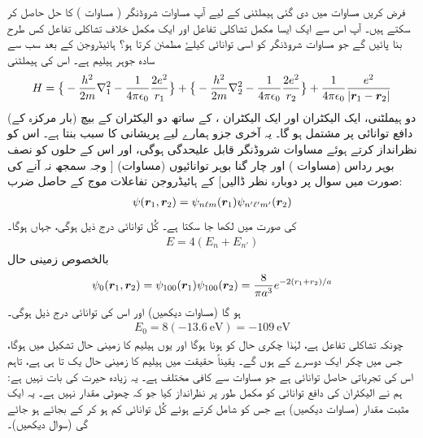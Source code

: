 فرض کریں مساوات  میں دی گئی ہیملٹنی کے لیے آپ مساوات شروڈنگر ( مساوات ) کا 
حل  حاصل کر سکتے ہیں۔ آپ اس سے ایک ایسا مکمل تشاکلی تفاعل اور ایک مکمل خلاف تشاکلی تفاعل کس طرح بنا پائیں گے جو مساوات شروڈنگر کو اسی توانائی کیلۓ مطمئن کرتا ہو؟
ہائیڈروجن کے بعد سب سے سادہ جوہر ہیلیم  ہے۔ اس کی ہیملٹنی
\begin{align}\label{مساوات_متماثل_ہیلیم_ہیملٹنی}
H= \big\{ -\frac{h^2}{2m}\nabla^2 _{1} -\frac{1}{4\pi\epsilon_{0}} \frac{2e^2}{r_{1}}\big\} +
 \big\{ -\frac{h^2}{2m} \nabla^2 _{2}-\frac{1}{4 \pi \epsilon_{0}} \frac{2e^2}{r_{2}}\big\}+ \frac{1}{4 \pi \epsilon_{0}}\frac{e^2}{|{{\boldsymbol{r}}}_{1} -{{\boldsymbol{r}}}_{2}|}
\end{align}
(بار  مرکزہ کے) دو  ہیملٹنی، ایک الیکٹران اور ایک الیکٹران ، کے ساتھ دو الیکٹران کے بیچ دافع توانائی پر مشتمل ہو گا۔ یہ آخری جزو ہمارے لیے پریشانی کا سبب بنتا ہے۔ اس کو نظرانداز کرتے ہوئے مساوات شروڈنگر قابل علیحدگی ہوگی، اور اس کے حلوں کو نصف بوہر رداس (مساوات ) اور چار گنا بوہر توانائیوں (مساوات) [ وجہ سمجھ نہ آنے کی صورت میں سوال  پر دوبارہ نظر ڈالیں] کے ہائیڈروجن تفاعلات موج کے حاصل ضرب:
\begin{align}
 \psi({{\boldsymbol{r}}}_{1}, {{\boldsymbol{r}}}_{2})= \psi_{n\ell m} ({{\boldsymbol{r}}}_{1}) \psi_{n'\ell' m'} ({{\boldsymbol{r}}}_{2})
\end{align}
کی صورت میں لکھا جا سکتا ہے۔ کُل توانائی درج ذیل ہوگی، جہاں  ہوگا۔
\begin{align}
 E= 4(E_{n} +E_{n'})
 \end{align}
بالخصوص زمینی حال 
\begin{align}\label{مساوات_متماثل_ہیلیم_زمینی_حال}
\psi_{0}({{\boldsymbol{r}}}_{1}, {{\boldsymbol{r}}}_{2})=\psi_{100}({{\boldsymbol{r}}}_{1}) \psi_{100}({{\boldsymbol{r}}}_{2})=\frac{8}{\pi a^3}e^{-2(r_{1} + r_{2})/a}
\end{align}
ہو گا (مساوات  دیکھیں) اور اس کی توانائی درج ذیل ہوگی۔
\begin{align}\label{مساوات_متماثل_ہیلیم_توانائی_الف}
 E_{0}=8(\SI{-13.6}{\electronvolt})=\SI{-109}{\electronvolt}
 \end{align}
چونکہ  تشاکلی تفاعل ہے، لہٰذا چکری حال کو  ہونا ہوگا اور یوں ہیلیم کا زمینی حال  تشکیل میں ہوگا، جس میں چکر ایک دوسرے کے  ہوں گے۔ یقیناً حقیقت میں ہیلیم کا زمینی حال یک تا ہی ہے، تاہم اس کی تجرباتی حاصل توانائی  ہے جو مساوات  سے کافی مختلف ہے۔ یہ زیادہ حیرت کی بات نہیں ہے: ہم نے الیکٹران کی دافع توانائی کو مکمل طور پر نظرانداز کیا جو کہ چھوٹی مقدار نہیں ہے۔ یہ ایک مثبت مقدار (مساوات  دیکھیں) ہے جس کو شامل کرتے ہوئے کُل توانائی کم ہو کر  کے بجائے  ہو جائے گی (سوال  دیکھیں)۔

